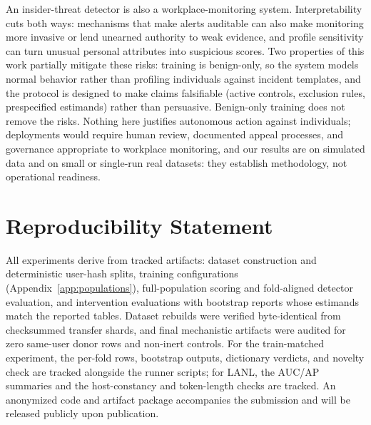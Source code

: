 \documentclass[10pt]{article} %
\begin{document}
An insider-threat detector is also a workplace-monitoring system.
Interpretability cuts both ways: mechanisms that make alerts auditable can
also make monitoring more invasive or lend unearned authority to weak
evidence, and profile sensitivity can turn unusual personal attributes into
suspicious scores. Two properties of this work partially mitigate these
risks: training is benign-only, so the system models normal behavior rather
than profiling individuals against incident templates, and the protocol is
designed to make claims falsifiable (active controls, exclusion rules,
prespecified estimands) rather than persuasive. Benign-only training does not
remove the risks. Nothing here justifies autonomous action against
individuals; deployments would require human review, documented appeal
processes, and governance appropriate to workplace monitoring, and our
results are on simulated data and on small or single-run real datasets: they
establish methodology, not operational readiness.

\section*{Reproducibility Statement}

All experiments derive from tracked artifacts: dataset construction and
deterministic user-hash splits, training configurations
(Appendix~\ref{app:populations}), full-population scoring and fold-aligned
detector evaluation, and intervention evaluations with bootstrap reports
whose estimands match the reported tables. Dataset rebuilds were verified
byte-identical from checksummed transfer shards, and final mechanistic
artifacts were audited for zero same-user donor rows and non-inert controls.
For the train-matched experiment, the per-fold rows, bootstrap outputs,
dictionary verdicts, and novelty check are tracked alongside the runner
scripts; for LANL, the AUC/AP summaries and the host-constancy and
token-length checks are tracked. An anonymized code and artifact package
accompanies the submission and will be released publicly upon publication.

\clearpage
\appendix




\end{document}
